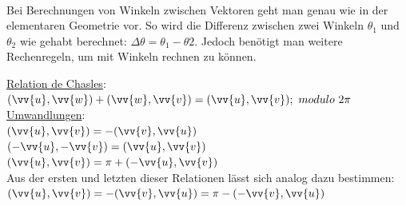         \paragraph{} Bei Berechnungen von Winkeln zwischen Vektoren geht man genau wie in der elementaren Geometrie vor. So wird die Differenz zwischen zwei Winkeln $\theta_{1}$ und $\theta_{2}$ wie gehabt berechnet: $\Delta\theta = \theta_{1} - \theta{2}$. Jedoch benötigt man weitere Rechenregeln, um mit Winkeln rechnen zu können.
        \\
        \begin{Theorem}
            \underline{Relation de Chasles}: \\
            $(\vv{u},\vv{w})+(\vv{w},\vv{v})=(\vv{u},\vv{v});\text{ }modulo\text{ }2\pi$ \\
            \underline{Umwandlungen}: \\
            $(\vv{u},\vv{v})=-(\vv{v},\vv{u})$ \\
            $(-\vv{u},-\vv{v})=(\vv{u},\vv{v})$ \\
            $(\vv{u},\vv{v})=\pi+(-\vv{u},\vv{v})$ \\
            Aus der ersten und letzten dieser Relationen lässt sich analog dazu bestimmen: \\
            $(\vv{u},\vv{v})=-(\vv{v},\vv{u})=\pi-(-\vv{v},\vv{u})$
        \end{Theorem}

        \\
        \\
        \\

